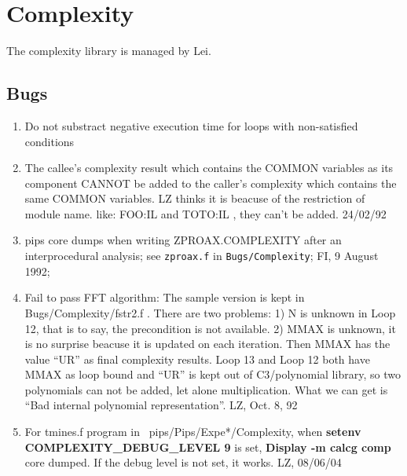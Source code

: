 \section{Complexity}

The complexity library is managed by Lei.

\subsection{Bugs}

\begin{enumerate}

  \item Do not substract negative execution time for loops with
        non-satisfied conditions

  \item The callee's complexity result which contains the COMMON
        variables as its component CANNOT be added to the caller's
        complexity which contains the same COMMON variables.
        LZ thinks it is beacuse of the restriction of module name.
        like: FOO:IL and TOTO:IL , they can't be added. 24/02/92

  \item pips core dumps when writing ZPROAX.COMPLEXITY after an
        interprocedural analysis;
        see \verb+zproax.f+ in \verb+Bugs/Complexity+;
        FI, 9 August 1992;

  \item Fail to pass FFT algorithm:
        The sample version is kept in Bugs/Complexity/fstr2.f .
        There are two problems: 1) N is unknown in Loop 12, that is to
        say, the precondition is not available.
        2) MMAX is unknown, it is no surprise beacuse it is updated
        on each iteration. Then MMAX has the value ``UR'' as final
        complexity results. Loop 13 and Loop 12 both have MMAX as 
        loop bound and ``UR'' is kept out of C3/polynomial library,
        so two polynomials can not be added, let alone multiplication.
        What we can get is ``Bad internal polynomial representation''.
        LZ, Oct. 8, 92

  \item For tmines.f program in ~pips/Pips/Expe*/Complexity,
        when {\bf setenv COMPLEXITY\_DEBUG\_LEVEL 9} is set,
        {\bf Display -m calcg comp} core dumped.
        If the debug level is not set, it works.
        LZ, 08/06/04

\end{enumerate}

